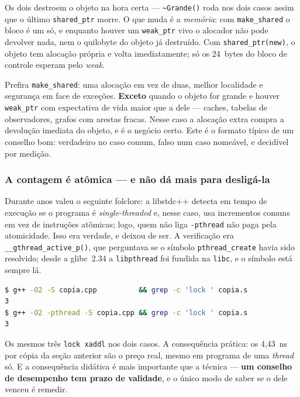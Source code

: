Os dois destroem o objeto na hora certa --- \texttt{\~{}Grande()} roda nos dois
casos assim que o último \texttt{shared\_ptr} morre. O que muda é a
\emph{memória}: com \texttt{make\_shared} o bloco é um só, e enquanto houver um
\texttt{weak\_ptr} vivo o alocador não pode devolver nada, nem o quilobyte do
objeto já destruído. Com \texttt{shared\_ptr(new)}, o objeto tem alocação
própria e volta imediatamente; só os 24~bytes do bloco de controle esperam pelo
\emph{weak}.

\begin{regra}
Prefira \texttt{make\_shared}: uma alocação em vez de duas, melhor localidade e
segurança em face de exceções. \textbf{Exceto} quando o objeto for grande e
houver \texttt{weak\_ptr} com expectativa de vida maior que a dele --- caches,
tabelas de observadores, grafos com arestas fracas. Nesse caso a alocação extra
compra a devolução imediata do objeto, e é o negócio certo. Este é o formato
típico de um conselho bom: verdadeiro no caso comum, falso num caso nomeável, e
decidível por medição.
\end{regra}

\subsubsection{A contagem é atômica --- e não dá mais para desligá-la}

Durante anos valeu o seguinte folclore: a libstdc++ detecta em tempo de execução
se o programa é \emph{single-threaded} e, nesse caso, usa incrementos comuns em
vez de instruções atômicas; logo, quem não liga \texttt{-pthread} não paga pela
atomicidade. Isso era verdade, e deixou de ser. A verificação era
\texttt{\_\_gthread\_active\_p()}, que perguntava se o símbolo
\texttt{pthread\_create} havia sido resolvido; desde a glibc~2.34 a
\texttt{libpthread} foi fundida na \texttt{libc}, e o símbolo está sempre lá.

\begin{lstlisting}[style=bt, language=bash,
    caption={Contagem de prefixos \texttt{lock} numa cópia de
             \texttt{shared\_ptr}, glibc 2.39.}]
$ g++ -O2 -S copia.cpp          && grep -c 'lock ' copia.s
3
$ g++ -O2 -pthread -S copia.cpp && grep -c 'lock ' copia.s
3
\end{lstlisting}

Os mesmos três \texttt{lock xaddl} nos dois casos. A consequência prática: os
4,43~ns por cópia da seção anterior são o preço real, mesmo em programa de uma
\emph{thread} só. E a consequência didática é mais importante que a técnica ---
\textbf{um conselho de desempenho tem prazo de validade}, e o único modo de
saber se o dele venceu é remedir.

